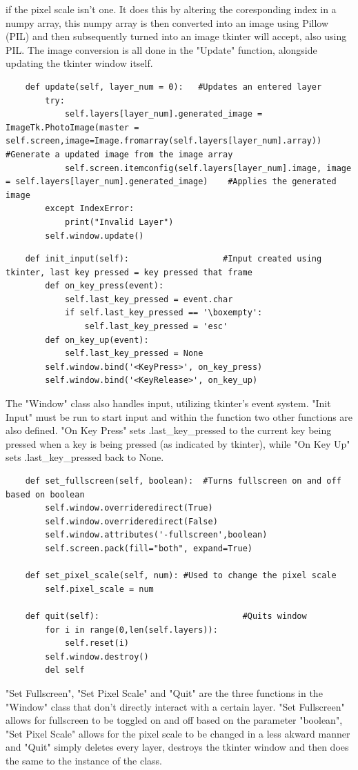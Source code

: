 \documentclass{article}
\begin{document}
if the pixel scale isn't one. It does this by altering the coresponding index in a numpy array, this numpy array is then converted into an
image using Pillow (PIL) and then subsequently turned into an image tkinter will accept, also using PIL. The image conversion is all done
in the "Update" function, alongside updating the tkinter window itself.
\begin{lstlisting}
    def update(self, layer_num = 0):   #Updates an entered layer
        try:
            self.layers[layer_num].generated_image = ImageTk.PhotoImage(master = self.screen,image=Image.fromarray(self.layers[layer_num].array)) #Generate a updated image from the image array
            self.screen.itemconfig(self.layers[layer_num].image, image = self.layers[layer_num].generated_image)    #Applies the generated image
        except IndexError:
            print("Invalid Layer")
        self.window.update()
\end{lstlisting}
\begin{lstlisting}
    def init_input(self):                   #Input created using tkinter, last key pressed = key pressed that frame
        def on_key_press(event):
            self.last_key_pressed = event.char
            if self.last_key_pressed == '\boxempty':
                self.last_key_pressed = 'esc'
        def on_key_up(event):
            self.last_key_pressed = None
        self.window.bind('<KeyPress>', on_key_press)
        self.window.bind('<KeyRelease>', on_key_up)
\end{lstlisting}
The "Window" class also handles input, utilizing tkinter's event system. "Init Input" must be run to start input and within the function two other
functions are also defined. "On Key Press" sets .last\_key\_pressed to the current key being pressed when a key is being pressed (as indicated by tkinter), while
"On Key Up" sets .last\_key\_pressed back to \textcolor{amber}{None}. 
\begin{lstlisting}
    def set_fullscreen(self, boolean):  #Turns fullscreen on and off based on boolean
        self.window.overrideredirect(True)
        self.window.overrideredirect(False)
        self.window.attributes('-fullscreen',boolean)
        self.screen.pack(fill="both", expand=True)

    def set_pixel_scale(self, num): #Used to change the pixel scale
        self.pixel_scale = num

    def quit(self):                             #Quits window
        for i in range(0,len(self.layers)):
            self.reset(i)
        self.window.destroy()
        del self
\end{lstlisting}
"Set Fullscreen", "Set Pixel Scale" and "Quit" are the three functions in the "Window" class that don't directly interact with a certain layer. "Set Fullscreen" allows for fullscreen
to be toggled on and off based on the parameter "boolean", "Set Pixel Scale" allows for the pixel scale to be changed in a less akward manner and "Quit" simply deletes every layer,
destroys the tkinter window and then does the same to the instance of the class.
\end{document}
